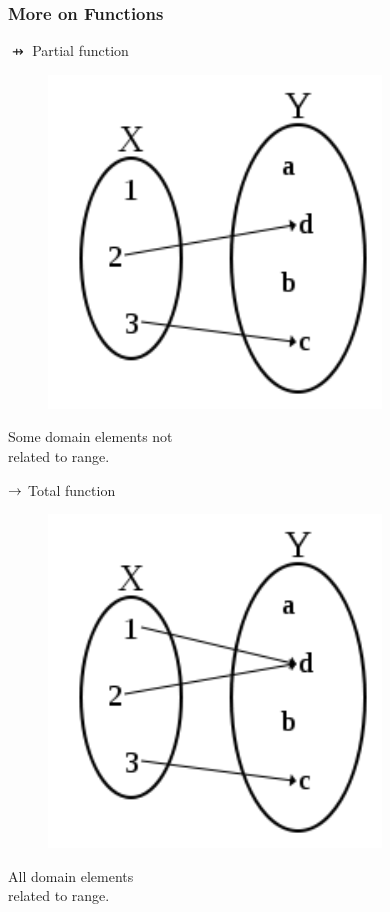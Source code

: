 \documentclass{beamer}
\begin{document}
\begin{frame}
\frametitle{More on Functions}
\begin{minipage}[t]{0.45\textwidth}
\begin{center}
$\pfun$ Partial function
\begin{figure}
	\includegraphics[scale=0.5]{Partial_function}
\end{figure}
Some domain elements not\\
related to range.
\end{center}
\end{minipage}
\begin{minipage}[t]{0.45\textwidth}
\begin{center}
$\mathbin\rightarrow$ Total function
\begin{figure}
	\includegraphics[scale=0.5]{Total_function}
\end{figure}
All domain elements\\
related to range.
\end{center}
\end{minipage}

\end{frame}
\end{document}
